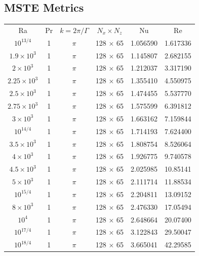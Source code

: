 \documentclass[reprint,amsmath,amssymb,aps]{revtex4-1}
\begin{document}
\subsection{MSTE Metrics}\label{sec:tables}
\begin{longtable*}{cccccc}
    \quad\quad\quad Ra	\quad\quad\quad	&	\quad\quad\quad		Pr	\quad\quad\quad		&	\quad\quad\quad		$k=2\pi/\Gamma$	\quad\quad\quad		&	\quad\quad\quad		$N_x \times N_z$	\quad\quad\quad		&	\quad\quad\quad		Nu	\quad\quad\quad		&	\quad\quad\quad		Re	\quad\quad\quad\\
    $10^{13/4}$	&	1	&	$\pi$	&	128 $\times$ 65	&	1.056590	&	1.617336\\
    $1.9\times10^3$	&	1	&	$\pi$	&	128 $\times$ 65	&	1.145807	&	2.682155\\
    $2\times10^3$	&	1	&	$\pi$	&	128 $\times$ 65	&	1.212037	&	3.317190\\
    $2.25\times10^3$	&	1	&	$\pi$	&	128 $\times$ 65	&	1.355410	&	4.550975\\
    $2.5\times10^3$	&	1	&	$\pi$	&	128 $\times$ 65	&	1.474455	&	5.537770\\
    $2.75\times10^3$	&	1	&	$\pi$	&	128 $\times$ 65	&	1.575599	&	6.391812\\
    $3\times10^3$	&	1	&	$\pi$	&	128 $\times$ 65	&	1.663162	&	7.159844\\
    $10^{14/4}$	&	1	&	$\pi$	&	128 $\times$ 65	&	1.714193	&	7.624400\\
    $3.5\times10^3$	&	1	&	$\pi$	&	128 $\times$ 65	&	1.808754	&	8.526064\\
    $4\times10^3$	&	1	&	$\pi$	&	128 $\times$ 65	&	1.926775	&	9.740578\\
    $4.5\times10^3$	&	1	&	$\pi$	&	128 $\times$ 65	&	2.025985	&	10.85141\\
    $5\times10^3$	&	1	&	$\pi$	&	128 $\times$ 65	&	2.111714	&	11.88534\\
    $10^{15/4}$	&	1	&	$\pi$	&	128 $\times$ 65	&	2.204811	&	13.09152\\
    $8\times10^3$	&	1	&	$\pi$	&	128 $\times$ 65	&	2.476330	&	17.05494\\
    $10^4$	&	1	&	$\pi$	&	128 $\times$ 65	&	2.648664	&	20.07400\\
    $10^{17/4}$	&	1	&	$\pi$	&	128 $\times$ 65	&	3.122843	&	29.50047\\
    $10^{18/4}$	&	1	&	$\pi$	&	128 $\times$ 65	&	3.665041	&	42.29585\\

\end{longtable*}
\end{document}
